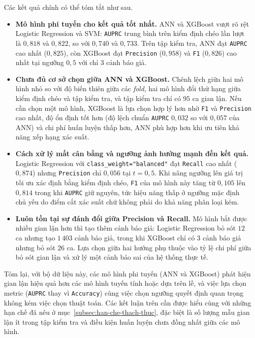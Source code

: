 Các kết quả chính có thể tóm tắt như sau.
\begin{itemize}
    \item \textbf{Mô hình phi tuyến cho kết quả tốt nhất.} ANN và XGBoost vượt rõ rệt Logistic Regression và SVM: \texttt{AUPRC} trung bình trên kiểm định chéo lần lượt là $0{,}818$ và $0{,}822$, so với $0{,}740$ và $0{,}733$. Trên tập kiểm tra, ANN đạt \texttt{AUPRC} cao nhất ($0{,}825$), còn XGBoost đạt \texttt{Precision} ($0{,}958$) và \texttt{F1} ($0{,}826$) cao nhất tại ngưỡng $0{,}5$ với chỉ $3$ cảnh báo giả.
    \item \textbf{Chưa đủ cơ sở chọn giữa ANN và XGBoost.} Chênh lệch giữa hai mô hình nhỏ so với độ biến thiên giữa các \textit{fold}, hai mô hình đổi thứ hạng giữa kiểm định chéo và tập kiểm tra, và tập kiểm tra chỉ có $95$ ca gian lận. Nếu cần chọn một mô hình, XGBoost là lựa chọn hợp lý hơn nhờ \texttt{F1} và \texttt{Precision} cao nhất, độ ổn định tốt hơn (độ lệch chuẩn \texttt{AUPRC} $0{,}032$ so với $0{,}057$ của ANN) và chi phí huấn luyện thấp hơn, ANN phù hợp hơn khi ưu tiên khả năng xếp hạng xác suất.
    \item \textbf{Cách xử lý mất cân bằng và ngưỡng ảnh hưởng mạnh đến kết quả.} Logistic Regression với \texttt{class\_weight="balanced"} đạt \texttt{Recall} cao nhất ($0{,}874$) nhưng \texttt{Precision} chỉ $0{,}056$ tại $t=0{,}5$. Khi nâng ngưỡng lên giá trị tối ưu xác định bằng kiểm định chéo, \texttt{F1} của mô hình này tăng từ $0{,}105$ lên $0{,}814$ trong khi \texttt{AUPRC} giữ nguyên, tức hiệu năng thấp ở ngưỡng mặc định chủ yếu do điểm cắt xác suất chứ không phải do khả năng phân loại kém.
    \item \textbf{Luôn tồn tại sự đánh đổi giữa Precision và Recall.} Mô hình bắt được nhiều gian lận hơn thì tạo thêm cảnh báo giả: Logistic Regression bỏ sót $12$ ca nhưng tạo $1\,403$ cảnh báo giả, trong khi XGBoost chỉ có $3$ cảnh báo giả nhưng bỏ sót $26$ ca. Lựa chọn giữa hai hướng phụ thuộc vào tỷ lệ chi phí giữa bỏ sót gian lận và xử lý một cảnh báo sai của hệ thống thực tế.
\end{itemize}

Tóm lại, với bộ dữ liệu này, các mô hình phi tuyến (ANN và XGBoost) phát hiện gian lận hiệu quả hơn các mô hình tuyến tính hoặc dựa trên lề, và việc lựa chọn metric (\texttt{AUPRC} thay vì \texttt{Accuracy}) cùng việc chọn ngưỡng quyết định quan trọng không kém việc chọn thuật toán. Các kết luận trên cần được hiểu cùng với những hạn chế đã nêu ở mục~\ref{subsec:han-che-thach-thuc}, đặc biệt là số lượng mẫu gian lận ít trong tập kiểm tra và điều kiện huấn luyện chưa đồng nhất giữa các mô hình.